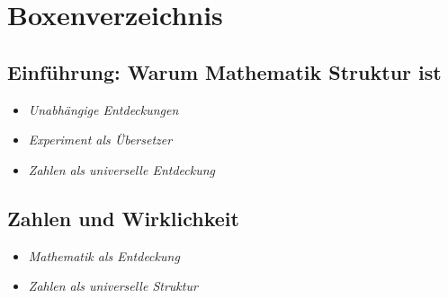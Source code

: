 \cleardoublepage




\chapter{Boxenverzeichnis}
\label{anhangB}




\thispagestyle{empty}



\section{Einführung: Warum Mathematik \newline Struktur ist}
\begin{NoteBox}[Hinweisboxen]

		\begin{itemize}
	\item \emph{Unabhängige Entdeckungen}\dotfill \pageref{box:entdeckung}
	\item \emph{Experiment als Übersetzer}\dotfill \pageref{box:experiment}
	

	\item \emph{Zahlen als universelle Entdeckung}\dotfill \pageref{box:universelle}



		\end{itemize}
\end{NoteBox}

\section{Zahlen und Wirklichkeit}
\begin{NoteBox}[Hinweisboxen]
	
	\begin{itemize}
		
		\item \emph{Mathematik als Entdeckung}\dotfill \pageref{box:mathentdeckung}
		\item \emph{Zahlen als universelle Struktur}\dotfill \pageref{box:negative}
		
	\end{itemize}
\end{NoteBox}

